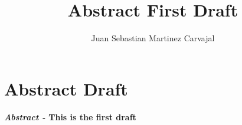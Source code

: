 \documentclass[a4paper]{journal}
\title{Abstract First Draft}
\author{Juan Sebastian Martinez Carvajal}
\date{}
\begin{document}
\maketitle
\hrulefill

\section{Abstract Draft}

\textbf
{
\textit{Abstract - } This is the first draft
}
\end{document}
